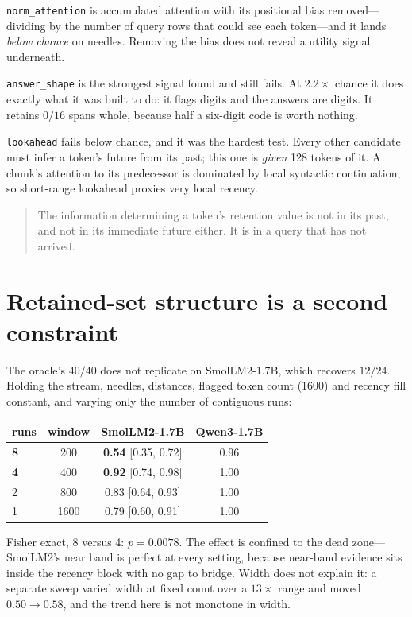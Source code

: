 \documentclass[10pt]{article}
\begin{document}
\texttt{norm\_attention} is accumulated attention with its positional bias
removed---dividing by the number of query rows that could see each token---and
it lands \emph{below chance} on needles. Removing the bias does not reveal a
utility signal underneath.

\texttt{answer\_shape} is the strongest signal found and still fails. At
$2.2\times$ chance it does exactly what it was built to do: it flags digits and
the answers are digits. It retains $0/16$ spans whole, because half a
six-digit code is worth nothing.

\texttt{lookahead} fails below chance, and it was the hardest test. Every other
candidate must infer a token's future from its past; this one is \emph{given}
128 tokens of it. A chunk's attention to its predecessor is dominated by local
syntactic continuation, so short-range lookahead proxies very local recency.

\begin{quote}
The information determining a token's retention value is not in its past, and
not in its immediate future either. It is in a query that has not arrived.
\end{quote}

\section{Retained-set structure is a second constraint}\label{sec:frag}

The oracle's $40/40$ does not replicate on SmolLM2-1.7B, which recovers
$12/24$. Holding the stream, needles, distances, flagged token count (1600) and
recency fill constant, and varying only the number of contiguous runs:

\begin{table}[h]\centering\small
\begin{tabular}{lccc}
\toprule
runs & window & SmolLM2-1.7B & Qwen3-1.7B \\
\midrule
\textbf{8} & 200  & \textbf{0.54} [0.35, 0.72] & 0.96 \\
\textbf{4} & 400  & \textbf{0.92} [0.74, 0.98] & 1.00 \\
2 & 800  & 0.83 [0.64, 0.93] & 1.00 \\
1 & 1600 & 0.79 [0.60, 0.91] & 1.00 \\
\bottomrule
\end{tabular}
\end{table}

Fisher exact, 8 versus 4: $p = 0.0078$. The effect is confined to the dead
zone---SmolLM2's near band is perfect at every setting, because near-band
evidence sits inside the recency block with no gap to bridge. Width does not
explain it: a separate sweep varied width at fixed count over a $13\times$
range and moved $0.50 \to 0.58$, and the trend here is not monotone in width.
\end{document}
